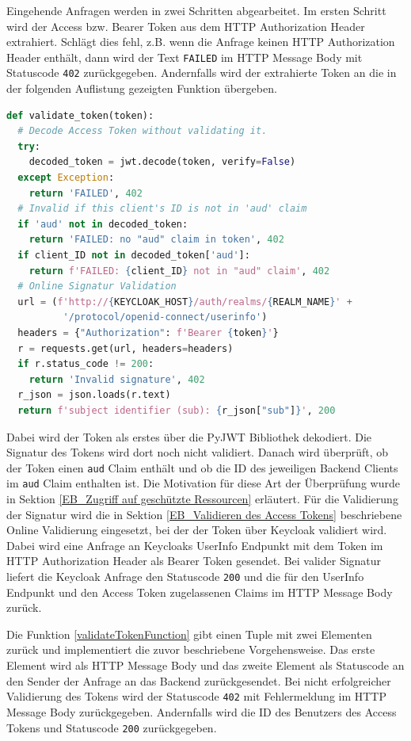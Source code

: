 Eingehende Anfragen werden in zwei Schritten abgearbeitet. Im ersten Schritt wird der Access bzw. Bearer Token aus dem HTTP Authorization Header extrahiert. Schlägt dies fehl, z.B. wenn die Anfrage keinen HTTP Authorization Header enthält, dann wird der Text \texttt{FAILED} im HTTP Message Body mit Statuscode \texttt{402} zurückgegeben. Andernfalls wird der extrahierte Token an die in der folgenden Auflistung gezeigten Funktion übergeben.

\begin{lstlisting}[caption=Token Validierung im Backend, captionpos=b, language=python, label=validateTokenFunction]
def validate_token(token):
  # Decode Access Token without validating it.
  try:
    decoded_token = jwt.decode(token, verify=False)
  except Exception:
    return 'FAILED', 402
  # Invalid if this client's ID is not in 'aud' claim
  if 'aud' not in decoded_token:
    return 'FAILED: no "aud" claim in token', 402
  if client_ID not in decoded_token['aud']:
    return f'FAILED: {client_ID} not in "aud" claim', 402
  # Online Signatur Validation
  url = (f'http://{KEYCLOAK_HOST}/auth/realms/{REALM_NAME}' +
          '/protocol/openid-connect/userinfo')
  headers = {"Authorization": f'Bearer {token}'}
  r = requests.get(url, headers=headers)
  if r.status_code != 200:
    return 'Invalid signature', 402
  r_json = json.loads(r.text)
  return f'subject identifier (sub): {r_json["sub"]}', 200
\end{lstlisting}

Dabei wird der Token als erstes über die PyJWT Bibliothek dekodiert. Die Signatur des Tokens wird dort noch nicht validiert. Danach wird überprüft, ob der Token einen \texttt{aud} Claim enthält und ob die ID des jeweiligen Backend Clients im \texttt{aud} Claim enthalten ist. Die Motivation für diese Art der Überprüfung wurde in Sektion \ref{EB_Zugriff auf geschützte Ressourcen} erläutert. Für die Validierung der Signatur wird die in Sektion \ref{EB_Validieren des Access Tokens} beschriebene Online Validierung eingesetzt, bei der der Token über Keycloak validiert wird. Dabei wird eine Anfrage an Keycloaks UserInfo Endpunkt mit dem Token im HTTP Authorization Header als Bearer Token gesendet. Bei valider Signatur liefert die Keycloak Anfrage den Statuscode \texttt{200} und die für den UserInfo Endpunkt und den Access Token zugelassenen Claims im HTTP Message Body zurück. 

Die Funktion \ref{validateTokenFunction} gibt einen Tuple mit zwei Elementen zurück und implementiert die zuvor beschriebene Vorgehensweise. Das erste Element wird als HTTP Message Body und das zweite Element als Statuscode an den Sender der Anfrage an das Backend zurückgesendet. Bei nicht erfolgreicher Validierung des Tokens wird der Statuscode \texttt{402} mit Fehlermeldung im HTTP Message Body zurückgegeben. Andernfalls wird die ID des Benutzers des Access Tokens und Statuscode \texttt{200} zurückgegeben.



